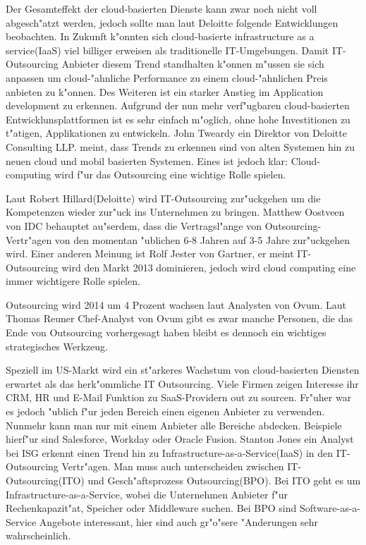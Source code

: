 Der Gesamteffekt der cloud-basierten Dienste kann zwar noch nicht voll abgesch"atzt werden, jedoch sollte man laut Deloitte folgende Entwicklungen beobachten. In Zukunft k"onnten sich cloud-basierte infrastructure as a service(IaaS) viel billiger erweisen als traditionelle IT-Umgebungen. Damit IT-Outsourcing Anbieter diesem Trend standhalten k"onnen m"ussen sie sich anpassen um cloud-"ahnliche Performance zu einem cloud-"ahnlichen Preis anbieten zu k"onnen.
Des Weiteren ist ein starker Anstieg im Application development zu erkennen. Aufgrund der nun mehr verf"ugbaren cloud-basierten Entwicklunsplattformen ist es sehr einfach m"oglich, ohne hohe Investitionen zu t"atigen, Applikationen zu entwickeln.
John Tweardy ein Direktor von Deloitte Consulting LLP. meint, dass Trends zu erkennen sind von alten Systemen hin zu neuen cloud und mobil basierten Systemen. Eines ist jedoch klar: Cloud-computing wird f"ur das Outsourcing eine wichtige Rolle spielen.
\cite{L339}

Laut Robert Hillard(Deloitte) wird IT-Outsourcing zur"uckgehen um die Kompetenzen wieder zur"uck ins Unternehmen zu bringen. Matthew Oostveen von IDC behauptet au"serdem, dass die Vertragsl"ange von Outsourcing-Vertr"agen von den momentan "ublichen 6-8 Jahren auf 3-5 Jahre zur"uckgehen wird.
Einer anderen Meinung ist Rolf Jester von Gartner, er meint IT-Outsourcing wird den Markt 2013 dominieren, jedoch wird cloud computing eine immer wichtigere Rolle spielen.
\cite{341}

Outsourcing wird 2014 um 4 Prozent wachsen laut Analysten von Ovum. Laut Thomas Reuner Chef-Analyst von Ovum gibt es zwar manche Personen, die das Ende von Outsourcing vorhergesagt haben bleibt es dennoch ein wichtiges strategisches Werkzeug.
\cite{OVUM342}

Speziell im US-Markt wird ein st"arkeres Wachstum von cloud-basierten Diensten erwartet als das herk"ommliche IT Outsourcing. Viele Firmen zeigen Interesse ihr CRM, HR und E-Mail Funktion zu SaaS-Providern out zu sourcen. Fr"uher war es jedoch "ublich f"ur jeden Bereich einen eigenen Anbieter zu verwenden. Nunmehr kann man nur mit einem Anbieter alle Bereiche abdecken. Beispiele hierf"ur sind Salesforce, Workday oder Oracle Fusion.
Stanton Jones ein Analyst bei ISG erkennt einen Trend hin zu Infrastructure-as-a-Service(IaaS) in den IT-Outsourcing Vertr"agen. Man muss auch unterscheiden zwischen IT-Outsourcing(ITO) und Gesch"aftsprozess Outsourcing(BPO). Bei ITO geht es um Infrastructure-as-a-Service, wobei die Unternehmen Anbieter f"ur Rechenkapazit"at, Speicher oder Middleware suchen. Bei BPO sind Software-as-a-Service Angebote interessant, hier sind auch gr"o"sere "Anderungen sehr wahrscheinlich.
\cite{ISG17}
